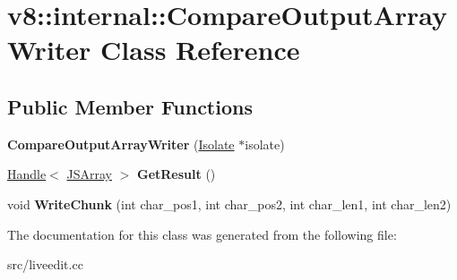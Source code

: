 \hypertarget{classv8_1_1internal_1_1_compare_output_array_writer}{}\section{v8\+:\+:internal\+:\+:Compare\+Output\+Array\+Writer Class Reference}
\label{classv8_1_1internal_1_1_compare_output_array_writer}
\subsection*{Public Member Functions}
\begin{DoxyCompactItemize}
\item 
\hypertarget{classv8_1_1internal_1_1_compare_output_array_writer_a737c1515098817584e9e10c7fb77f09c}{}{\bfseries Compare\+Output\+Array\+Writer} (\hyperlink{classv8_1_1internal_1_1_isolate}{Isolate} $\ast$isolate)\label{classv8_1_1internal_1_1_compare_output_array_writer_a737c1515098817584e9e10c7fb77f09c}

\item 
\hypertarget{classv8_1_1internal_1_1_compare_output_array_writer_ac19f607dc9c18b1d3b0828cabfee8c6c}{}\hyperlink{classv8_1_1internal_1_1_handle}{Handle}$<$ \hyperlink{classv8_1_1internal_1_1_j_s_array}{J\+S\+Array} $>$ {\bfseries Get\+Result} ()\label{classv8_1_1internal_1_1_compare_output_array_writer_ac19f607dc9c18b1d3b0828cabfee8c6c}

\item 
\hypertarget{classv8_1_1internal_1_1_compare_output_array_writer_a3e5e5b33af60cec3f3da87f24703fe5f}{}void {\bfseries Write\+Chunk} (int char\+\_\+pos1, int char\+\_\+pos2, int char\+\_\+len1, int char\+\_\+len2)\label{classv8_1_1internal_1_1_compare_output_array_writer_a3e5e5b33af60cec3f3da87f24703fe5f}

\end{DoxyCompactItemize}


The documentation for this class was generated from the following file\+:\begin{DoxyCompactItemize}
\item 
src/liveedit.\+cc\end{DoxyCompactItemize}
